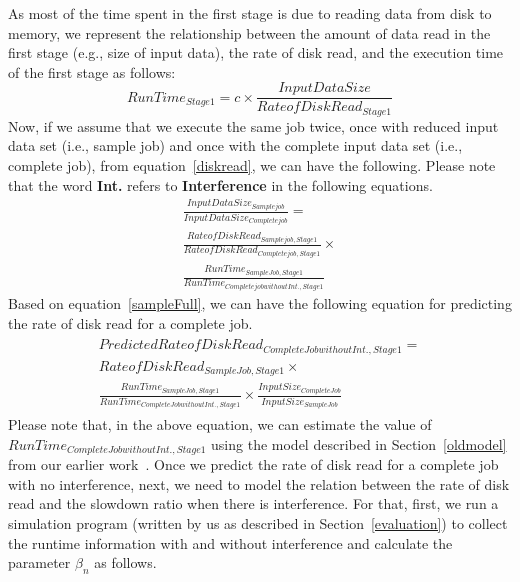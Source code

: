 \noindent 
As most of the time spent in the first stage is due to reading data from disk to memory, we represent the relationship between the amount of data read in the first stage (e.g., size of input data), the rate of disk read, and the execution time of the first stage as follows: 
\begin{equation}
\label{diskread}
RunTime_{Stage 1}=c \times \frac{Input Data Size}{Rate of DiskRead_{Stage 1}} \end{equation}
\noindent 
Now, if we assume that we execute the same job twice, once with reduced input data set (i.e., sample job) and once with the complete input data set (i.e., complete job), from equation~\ref{diskread}, we can have the following. Please note that the word {\textbf{Int.}} refers to {\textbf{Interference}} in the following equations. 
\begin{equation}
\label{sampleFull}
\begin{gathered}
\frac{InputDataSize_{Sample job}}{InputDataSize_{Complete job}} = \\
\frac{Rate of Disk Read_{Sample job, Stage 1}}{RateofDiskRead_{Complete job, Stage 1}} \times \\
\frac{RunTime_{Sample Job, Stage 1}}{RunTime_{Complete job without Int., Stage 1}}
\end{gathered}
\end{equation}
Based on equation~\ref{sampleFull}, we can have the following equation for predicting the rate of disk read for a complete job. 
\begin{eqnarray}
\label{fullDiskIORead}
\begin{gathered}
Predicted Rate of Disk Read_{Complete Job without Int., Stage1} \nonumber = \\
Rate of Disk Read_{Sample Job, Stage 1} \times \\
\frac{RunTime_{Sample Job, Stage 1}}{RunTime_{Complete Job without Int., Stage 1}} \times \frac{Input Size_{Complete Job}}{Input Size_{Sample Job}}
\end{gathered}
\end{eqnarray}
\noindent
Please note that, in the above equation, we can estimate the value of $RunTime_{Complete Job without Int., Stage 1}$ using the model described in Section~\ref{oldmodel} from our earlier work~\cite{wangperformance}. Once we predict the rate of disk read for a complete job with no interference, next, we need to model the relation between the rate of disk read and the slowdown ratio when there is interference. For that, first, we run a simulation program (written by us as described in Section~\ref{evaluation}) to collect the runtime information with and without interference and calculate the parameter $\beta_{n}$ as follows.
